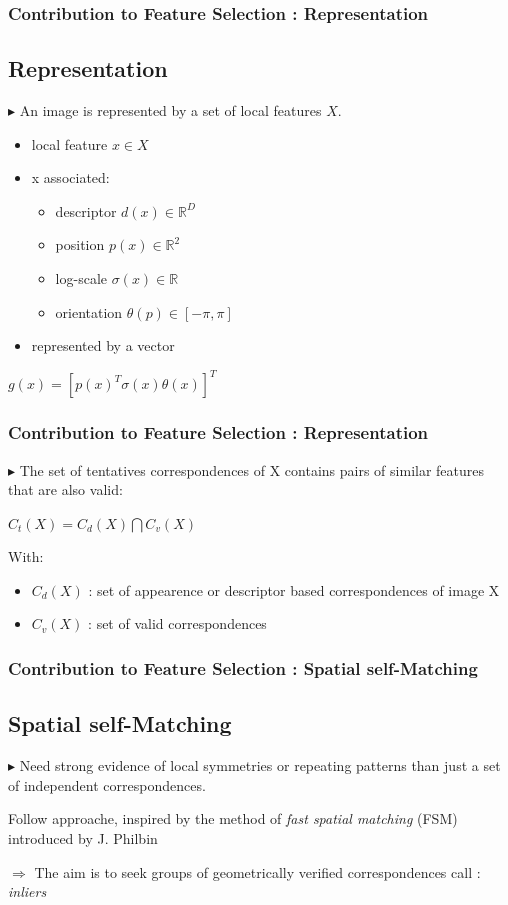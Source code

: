 \documentclass[11pt]{beamer}
\begin{document}
\begin{frame}
\frametitle{Contribution to Feature Selection : Representation}
\subsection{Representation}
$\blacktriangleright$ An image is represented by a set of local features $X$.

\begin{itemize}
\item local feature $x \in X$ 
\item x associated:
\begin{itemize}
\item descriptor $d(x) \in \mathbb{R}^D$
\item position $p(x) \in \mathbb{R}^2$
\item log-scale $\sigma(x) \in \mathbb{R}$
\item orientation $\theta(p) \in [-\pi, \pi]$ 
\end{itemize}
\item represented by a vector
\end{itemize}
\begin{center}
$g(x) = [p(x)^T \sigma(x) \theta(x)]^T$
\end{center}
\end{frame}

\begin{frame}
\frametitle{Contribution to Feature Selection : Representation}
$\blacktriangleright$ The set of tentatives correspondences of X contains pairs of similar features that are also valid:
\begin{center}
$C_t(X) = C_d(X) \bigcap C_v(X) $
\end{center}

With:
\begin{itemize}
\item $C_d(X)$ : set of appearence or descriptor based correspondences of image X
\item $C_v(X)$ : set of valid correspondences 
\end{itemize}
\end{frame}

\begin{frame}
\frametitle{Contribution to Feature Selection : Spatial self-Matching}
\subsection{Spatial self-Matching}
$\blacktriangleright$ Need strong evidence of local symmetries or repeating patterns than just a set of independent correspondences.

\vspace{0.2cm}
Follow approache, inspired by the method of \textit{fast spatial matching} (FSM) introduced by J. Philbin

\vspace{0.2cm}
$\Rightarrow$ The aim is to seek groups of geometrically verified correspondences call : \textit{inliers}

\end{frame}
\end{document}
